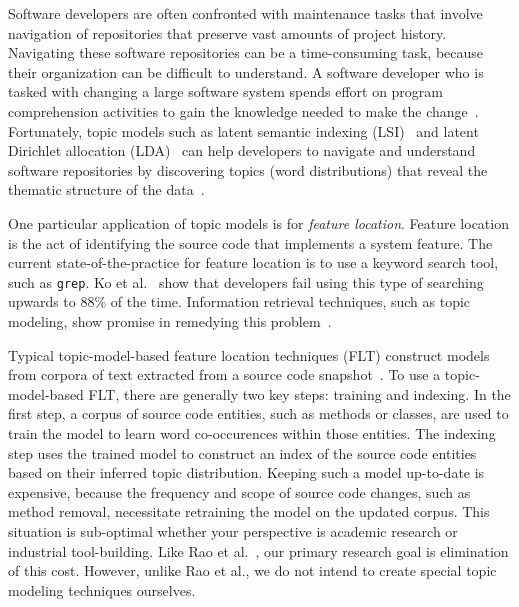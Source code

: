 
Software developers are often confronted with maintenance tasks that involve navigation of repositories that preserve vast amounts of project history.
Navigating these software repositories can be a time-consuming task, because their organization can be difficult to understand.
A software developer who is tasked with changing a large software system spends effort on program comprehension activities to gain the knowledge needed to make the change~\cite{Corbi:1989}.
Fortunately, topic models such as
latent semantic indexing (LSI)~\cite{Deerwester-etal:1990} and
latent Dirichlet allocation (LDA)~\cite{Blei-etal:2003}
can help developers to navigate and understand software repositories
by discovering topics (word distributions) that reveal the thematic structure
of the data~\cite{Linstead-etal:2007,Thomas-etal:2011,Hindle-etal:2012}.

One particular application of topic models is for \emph{feature location}.
Feature location is the act of identifying the source code that implements a system feature.
The current state-of-the-practice for feature location is to use a keyword search tool, such as \texttt{grep}.
Ko et al.~\cite{Ko-etal:2006} show that developers fail using this type of searching upwards to 88\% of the time.
Information retrieval techniques, such as topic modeling, show promise in remedying this problem~\cite{Marcus-etal:2004}.

Typical topic-model-based feature location techniques (FLT) construct models from corpora of text extracted from a source code snapshot~\cite{Dit-etal:2013b}.
To use a topic-model-based FLT, there are generally two key steps: training and indexing.
In the first step, a corpus of source code entities, such as methods or classes, are used to train the model to learn word co-occurences within those entities.
The indexing step uses the trained model to construct an index of the source code entities based on their inferred topic distribution.
Keeping such a model up-to-date is expensive, because the frequency and scope of source code changes, such as method removal, necessitate retraining the model on the updated corpus.
This situation is sub-optimal whether your perspective is academic research or industrial tool-building.
Like Rao et al.~\cite{Rao-etal:2013}, our primary research goal is elimination of this cost.
However, unlike Rao et al., we do not intend to create special topic modeling techniques ourselves.

